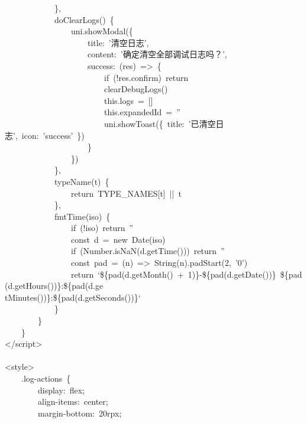 \documentclass[a4paper,10pt]{article}
\begin{document}
{\ttfamily\footnotesize\raggedright
~~~~~~~~~~~~\},\\
~~~~~~~~~~~~doClearLogs()~\{\\
~~~~~~~~~~~~~~~~uni.showModal(\{\\
~~~~~~~~~~~~~~~~~~~~title:~'清空日志',\\
~~~~~~~~~~~~~~~~~~~~content:~'确定清空全部调试日志吗？',\\
~~~~~~~~~~~~~~~~~~~~success:~(res)~=>~\{\\
~~~~~~~~~~~~~~~~~~~~~~~~if~(!res.confirm)~return\\
~~~~~~~~~~~~~~~~~~~~~~~~clearDebugLogs()\\
~~~~~~~~~~~~~~~~~~~~~~~~this.logs~=~[]\\
~~~~~~~~~~~~~~~~~~~~~~~~this.expandedId~=~''\\
~~~~~~~~~~~~~~~~~~~~~~~~uni.showToast(\{~title:~'已清空日志',~icon:~'success'~\})\\
~~~~~~~~~~~~~~~~~~~~\}\\
~~~~~~~~~~~~~~~~\})\\
~~~~~~~~~~~~\},\\
~~~~~~~~~~~~typeName(t)~\{\\
~~~~~~~~~~~~~~~~return~TYPE\_NAMES[t]~||~t\\
~~~~~~~~~~~~\},\\
~~~~~~~~~~~~fmtTime(iso)~\{\\
~~~~~~~~~~~~~~~~if~(!iso)~return~''\\
~~~~~~~~~~~~~~~~const~d~=~new~Date(iso)\\
~~~~~~~~~~~~~~~~if~(Number.isNaN(d.getTime()))~return~''\\
~~~~~~~~~~~~~~~~const~pad~=~(n)~=>~String(n).padStart(2,~'0')\\
~~~~~~~~~~~~~~~~return~`\$\{pad(d.getMonth()~+~1)\}-\$\{pad(d.getDate())\}~\$\{pad(d.getHours())\}:\$\{pad(d.ge\\
tMinutes())\}:\$\{pad(d.getSeconds())\}`\\
~~~~~~~~~~~~\}\\
~~~~~~~~\}\\
~~~~\}\\
</script>\\
\mbox{}\\
<style>\\
~~~~.log-actions~\{\\
~~~~~~~~display:~flex;\\
~~~~~~~~align-items:~center;\\
~~~~~~~~margin-bottom:~20rpx;\\
}
\end{document}
